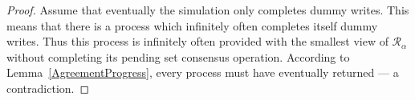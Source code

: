 \documentclass[a4paper]{article}
\def\R{\ensuremath{\mathcal{R}}}
\begin{document}
\MemSCcombined*

\begin{proof}
Assume that eventually the simulation only completes dummy writes. This
means that there is a process which infinitely often completes itself 
dummy writes. Thus this process is infinitely often provided with
the smallest view of $\R_\alpha$ without completing its pending 
set consensus operation. According to Lemma~\ref{AgreementProgress},
every process must have eventually returned --- a contradiction.
\end{proof}
\end{document}
